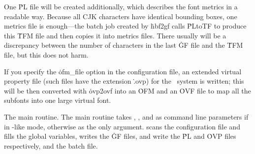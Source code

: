 One \.{PL} file will be created additionally, which describes the font
metrics in a readable way. Because all CJK characters have identical
bounding boxes, one metrics file is enough---the batch job created by
\.{hbf2gf} calls \.{PLtoTF} to produce this \.{TFM} file and then copies
it into  metrics files. There usually will be a discrepancy
between the number of characters in the last \.{GF} file and the
\.{TFM} file, but this does not harm.

If you specify the \.{ofm\_file} option in the configuration file, an
extended virtual property file (such files have the extension \.{.ovp}) for
the \Om\ system is written; this will be then converted with
\.{ovp2ovf} into an \.{OFM} and an \.{OVF} file to map all the subfonts
into one large virtual font.



\fi

The main routine.
The main routine takes , , and  as command
line parameters if in \mf-like mode, otherwise  as the
only
argument.  scans the configuration file and fills the
global
variables,  writes the \.{GF} files,  and
 write the \.{PL} and \.{OVP} files respectively, and
 the batch file.

